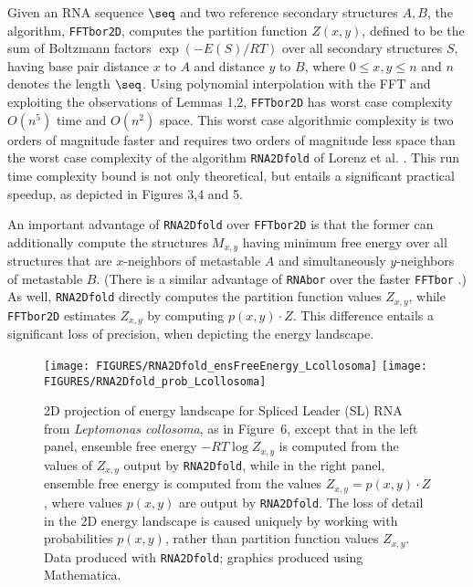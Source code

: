 Given an RNA sequence $\seq$ and two reference secondary structures $A,B$,
the algorithm, {\tt FFTbor2D}, computes the partition
function $Z(x,y)$, defined to be the sum of Boltzmann factors
$\exp(-E(S)/RT)$ over all secondary structures $S$, having base pair
distance $x$ to  $A$ and distance $y$ to $B$, where
$0 \leq x,y \leq n$ and $n$ denotes the length $\seq$.
Using polynomial interpolation with the FFT and exploiting the observations
of Lemmas 1,2, {\tt FFTbor2D} has worst case complexity
$O(n^5)$ time and $O(n^2)$ space. This worst case
algorithmic complexity is two orders of magnitude faster and requires two
orders of magnitude less space than the worst case complexity of the
algorithm {\tt RNA2Dfold} of Lorenz et al. \cite{hofacker:RNAbor2D}.
This run time complexity bound is not only theoretical, but entails
a significant practical speedup, as depicted in
Figures 3,4 and 5.

An important advantage of
{\tt RNA2Dfold} over {\tt FFTbor2D} is that the former can additionally
compute the structures $M_{x,y}$ having minimum free energy over all
structures that are $x$-neighbors of metastable $A$ and simultaneously
$y$-neighbors of metastable $B$. (There is a similar advantage of {\tt RNAbor}
\cite{Freyhult.b07} over the faster {\tt FFTbor} \cite{fftbor}.)
As well, {\tt RNA2Dfold} directly computes the partition function values
$Z_{x,y}$, while {\tt FFTbor2D} estimates $Z_{x,y}$ by computing
$p(x,y) \cdot Z$. This difference entails a significant loss of precision,
when depicting the energy landscape.


\begin{figure}[!t]
\begin{center}
\texttt{[image: FIGURES/RNA2Dfold\_ensFreeEnergy\_Lcollosoma]}
\hskip 1cm
\texttt{[image: FIGURES/RNA2Dfold\_prob\_Lcollosoma]}
\caption{\small
2D projection of energy landscape for Spliced Leader (SL) RNA
from {\em Leptomonas collosoma}, as in
Figure~6,
except that in the left panel, ensemble free energy $-RT \log Z_{x,y}$
is computed from the values of $Z_{x,y}$ output by {\tt RNA2Dfold},
while in the right panel, ensemble free energy is computed from
the values $Z_{x,y} = p(x,y) \cdot Z$, where values $p(x,y)$ are output
by {\tt RNA2Dfold}.
The loss of detail in the 2D energy landscape is caused uniquely by
working with probabilities $p(x,y)$, rather than partition function
values $Z_{x,y}$.
Data produced with {\tt RNA2Dfold}; graphics produced using Mathematica.
}
\label{fig:heatmapRNA2Dfold}
\end{center}
\end{figure}

